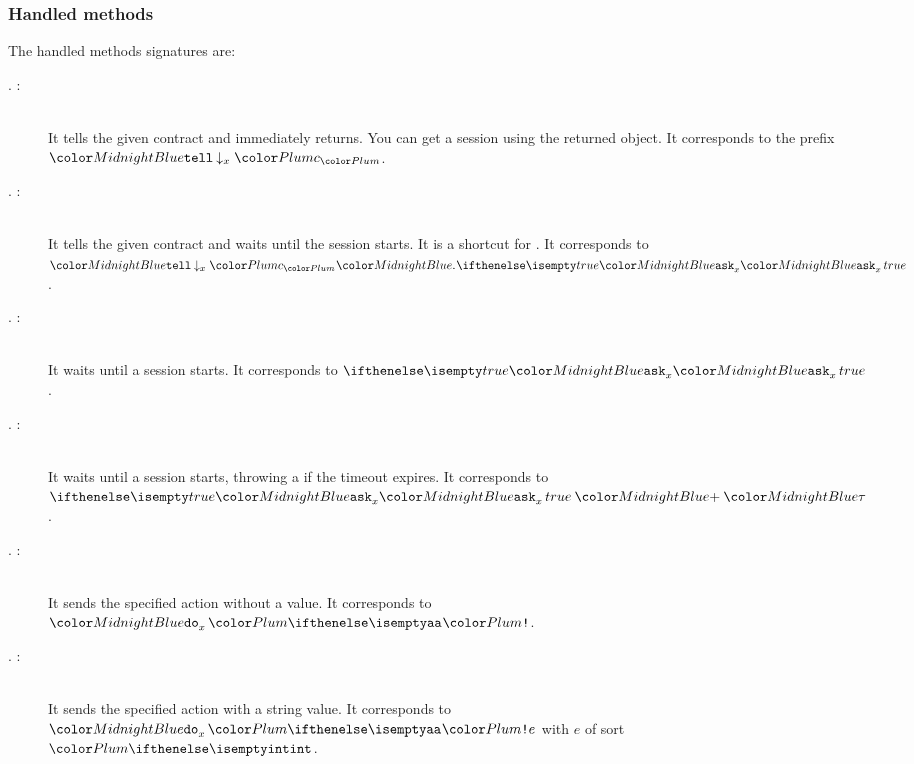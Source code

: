 \subsubsection{Handled methods}
The handled methods signatures are:
\begin{description}
	
	\item[. : ] \hfill \\
	It tells the given contract and immediately returns. You can get a session using the returned  object. It corresponds to the \coco prefix $\tell {} {\freeze x \contrP}$.
	
	\item[. : ] \hfill \\
	It tells the given contract and waits until the session starts. It is a shortcut for . It corresponds to $\tell {} {\freeze x \contrP} \cocoSeq \ask{x}{true}$.
	
	\item[. : ] \hfill \\
	It waits until a session starts. It corresponds to $\ask{x}{true}$.

	\item[. : ] \hfill \\
	It waits until a session starts, throwing a  if the timeout expires. It corresponds to $\ask{x}{true} \cocoPlus \tau$.
	
	\item[. : ] \hfill \\
	It sends the specified action without a value. It corresponds to $\fact x {\atomOut{a}}$.

	\item[. : ] \hfill \\
	It sends the specified action with a string value. It corresponds to $\fact x {\atomOut{a}} e$ with $e$ of sort $\sort{int}$.
	

\end{description}
